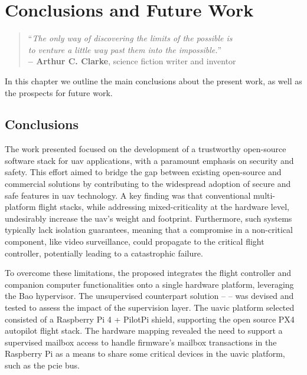 %
\chapter{Conclusions and Future Work}
\label{cha:concl}
%
\begin{quote}
\begin{flushright}
``\emph{The only way of discovering the limits of the possible is}\\
  \emph{to venture a little way past them into the impossible.}'' \\
\textbf{-- Arthur C. Clarke}, science fiction writer and inventor
\end{flushright}
\end{quote}

In this chapter we outline the main conclusions about the present work, as well
as the prospects for future work.

\section{Conclusions}
The work presented focused on the development of a
trustworthy open-source software stack for \gls{uav} applications, with a paramount emphasis on security and safety. This effort aimed to bridge the gap between existing open-source and commercial solutions by contributing to the widespread adoption of secure and safe features in \gls{uav} technology.
A key finding was that conventional multi-platform flight stacks, while
addressing mixed-criticality at the hardware level, undesirably increase the
\gls{uav}'s weight and footprint. Furthermore, such systems typically lack isolation
guarantees, meaning that a compromise in a non-critical component, like video
surveillance, could propagate to the critical flight controller, potentially
leading to a catastrophic failure.

To overcome these limitations, the proposed  integrates the flight controller and companion computer
functionalities onto a single hardware platform, leveraging the Bao
hypervisor. The unsupervised counterpart solution --  -- was
devised and tested to assess the impact of the supervision layer.
The \gls{uavic} platform selected
consisted of a Raspberry Pi 4 + PilotPi shield, supporting the open source
PX4 autopilot flight stack. The hardware mapping revealed the need to support a
supervised mailbox access to handle firmware's mailbox transactions in the
Raspberry Pi as a means to share some critical devices in the \gls{uavic}
platform, such as the \gls{pcie} bus.

